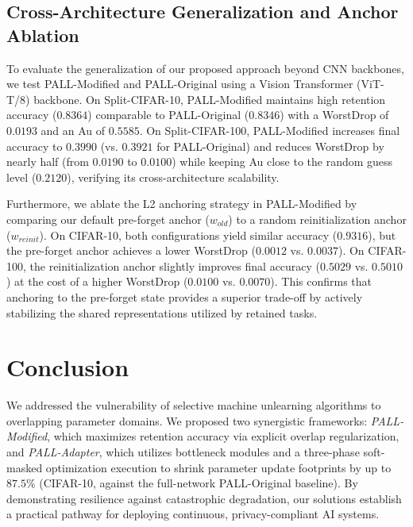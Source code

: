 \documentclass[conference]{IEEEtran}
\theoremstyle{plain}
\theoremstyle{definition}
\theoremstyle{remark}
\begin{document}
\subsection{Cross-Architecture Generalization and Anchor Ablation}
To evaluate the generalization of our proposed approach beyond CNN backbones, we test PALL-Modified and PALL-Original using a Vision Transformer (ViT-T/8) backbone. On Split-CIFAR-10, PALL-Modified maintains high retention accuracy ($0.8364$) comparable to PALL-Original ($0.8346$) with a WorstDrop of $0.0193$ and an Au of $0.5585$. On Split-CIFAR-100, PALL-Modified increases final accuracy to $0.3990$ (vs. $0.3921$ for PALL-Original) and reduces WorstDrop by nearly half (from $0.0190$ to $0.0100$) while keeping Au close to the random guess level ($0.2120$), verifying its cross-architecture scalability.

Furthermore, we ablate the L2 anchoring strategy in PALL-Modified by comparing our default pre-forget anchor ($w_{old}$) to a random reinitialization anchor ($w_{reinit}$). On CIFAR-10, both configurations yield similar accuracy ($0.9316$), but the pre-forget anchor achieves a lower WorstDrop ($0.0012$ vs. $0.0037$). On CIFAR-100, the reinitialization anchor slightly improves final accuracy ($0.5029$ vs. $0.5010$) at the cost of a higher WorstDrop ($0.0100$ vs. $0.0070$). This confirms that anchoring to the pre-forget state provides a superior trade-off by actively stabilizing the shared representations utilized by retained tasks.


\section{Conclusion}
We addressed the vulnerability of selective machine unlearning algorithms to overlapping parameter domains. We proposed two synergistic frameworks: \textit{PALL-Modified}, which maximizes retention accuracy via explicit overlap regularization, and \textit{PALL-Adapter}, which utilizes bottleneck modules and a three-phase soft-masked optimization execution to shrink parameter update footprints by up to \(87.5\%\) (CIFAR-10, against the full-network PALL-Original baseline). By demonstrating resilience against catastrophic degradation, our solutions establish a practical pathway for deploying continuous, privacy-compliant AI systems.
\end{document}
